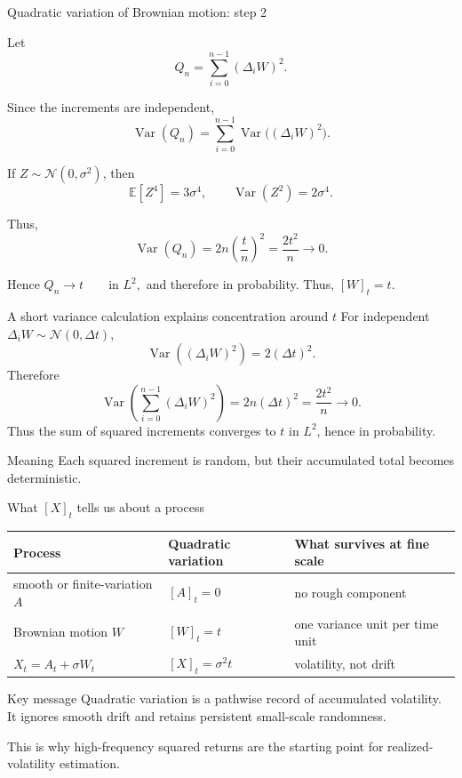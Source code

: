 \documentclass[handout,10pt,aspectratio=169]{beamer}
\newcommand{\E}{\mathbb E}
\begin{document}
\begin{frame}[shrink=5]{Quadratic variation of Brownian motion: step 2}

Let
\[
Q_n=\sum_{i=0}^{n-1}(\Delta_i W)^2.
\]

Since the increments are independent,
\[
\operatorname{Var}(Q_n)
=
\sum_{i=0}^{n-1}
\operatorname{Var}\big((\Delta_i W)^2\big).
\]

If \(Z\sim\mathcal N(0,\sigma^2)\), then
\[
\E[Z^4]=3\sigma^4,
\qquad
\operatorname{Var}(Z^2)=2\sigma^4.
\]

Thus,
\[
\operatorname{Var}(Q_n)
=
2n\left(\frac{t}{n}\right)^2
=
\frac{2t^2}{n}
\longrightarrow 0.
\]

Hence
$Q_n\longrightarrow t
\qquad\text{in }L^2,
$
and therefore in probability. Thus,
$
\boxed{[W]_t=t.}
$

\end{frame}

\begin{frame}{A short variance calculation explains concentration around \(t\)}
For independent \(\Delta_iW\sim\mathcal N(0,\Delta t)\),
\[
\operatorname{Var}\!\left((\Delta_iW)^2\right)=2(\Delta t)^2.
\]
Therefore
\[
\operatorname{Var}\!\left(
\sum_{i=0}^{n-1}(\Delta_iW)^2
\right)
=2n(\Delta t)^2
=\frac{2t^2}{n}\longrightarrow0.
\]
Thus the sum of squared increments converges to \(t\) in \(L^2\), hence in probability.
\begin{block}{Meaning}
Each squared increment is random, but their accumulated total becomes deterministic.
\end{block}
\end{frame}

\begin{frame}{What \([X]_t\) tells us about a process}
\begin{center}
\begin{tabular}{lll}
\toprule
Process & Quadratic variation & What survives at fine scale \\
\midrule
smooth or finite-variation \(A\) & \([A]_t=0\) & no rough component \\
Brownian motion \(W\) & \([W]_t=t\) & one variance unit per time unit \\
\(X_t=A_t+\sigma W_t\) & \([X]_t=\sigma^2t\) & volatility, not drift \\
\bottomrule
\end{tabular}
\end{center}
\begin{block}{Key message}
Quadratic variation is a pathwise record of accumulated volatility. It ignores smooth drift and retains persistent small-scale randomness.
\end{block}
This is why high-frequency squared returns are the starting point for realized-volatility estimation.
\end{frame}
\end{document}
